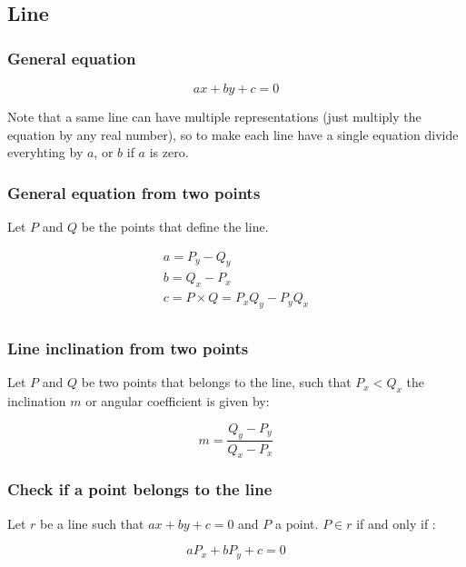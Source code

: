 \subsection{Line}

\subsubsection{General equation}

\begin{equation}
    ax + by + c = 0
\end{equation}

Note that a same line can have multiple representations (just multiply the equation by any real number), so to make each line have a single equation divide everyhting by $a$, or $b$ if $a$ is zero.

\subsubsection{General equation from two points}

Let $P$ and $Q$ be the points that define the line.

\[
  \begin{array}{l}
  a = P_y - Q_y \\
  b = Q_x-P_x  \\
  c = P \times Q = P_x Q_y - P_y Q_x \\
  \end{array}
\]


\subsubsection{Line inclination from two points}

Let $P$ and $Q$ be two points that belongs to the line, such that $P_x < Q_x$ the inclination $m$ or angular coefficient is given by:

\begin{equation}
    m = \frac{Q_y - P_y}{Q_x - P_x}
\end{equation}

\subsubsection{Check if a point belongs to the line}

Let $r$ be a line such that $ax + by + c = 0$ and $P$ a point. $P \in r$ if and only if :

\[
  a P_x + b P_y + c = 0
\]

